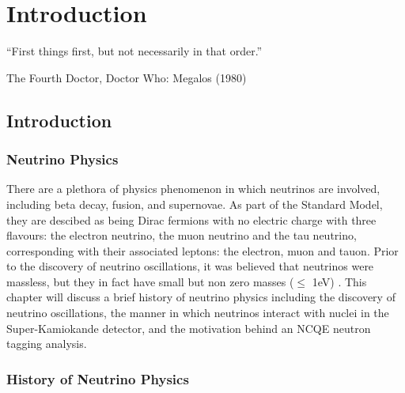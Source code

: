 \chapter{Introduction}
\label{chp:intro}
\epigraph{``First things first, but not necessarily in that order.''}{The Fourth Doctor, Doctor Who: Megalos (1980)}
\section{Introduction}

\subsection{Neutrino Physics}

There are a plethora of physics phenomenon in which neutrinos are involved, including beta decay, fusion, and supernovae. As part of the Standard Model, they are descibed as being Dirac fermions with no electric charge with three flavours: the electron neutrino, the muon neutrino and the tau neutrino, corresponding with their associated leptons: the electron, muon and tauon. Prior to the discovery of neutrino oscillations, it was believed that neutrinos were massless, but they in fact have small but non zero masses ($\le$ 1eV) \cite{Aker_2019}. This chapter will discuss a brief history of neutrino physics including the discovery of neutrino oscillations, the manner in which neutrinos interact with nuclei in the Super-Kamiokande detector, and the motivation behind an NCQE neutron tagging analysis.

\subsection{History of Neutrino Physics}

